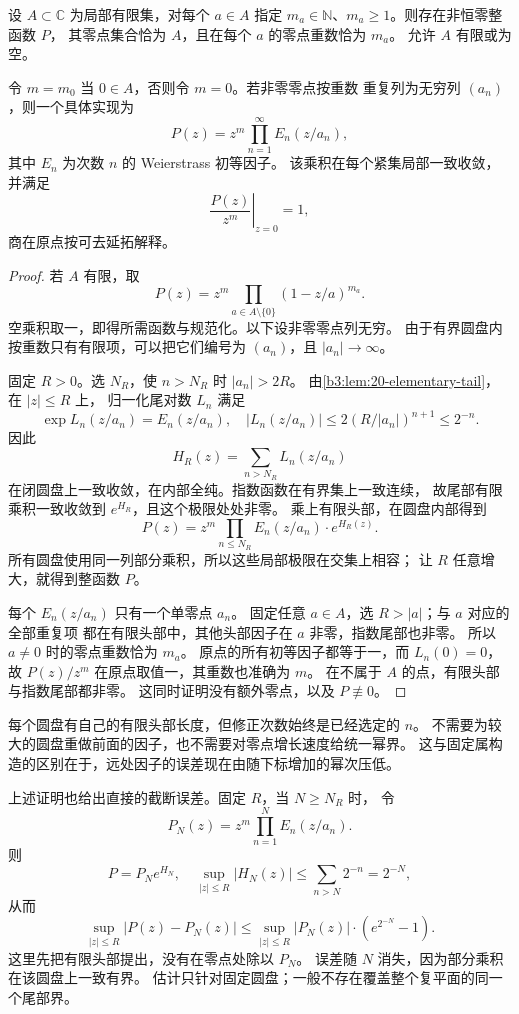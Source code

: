 \begin{theorem}\label{b3:thm:20-weierstrass}
设 \(A\subset\mathbb C\) 为局部有限集，对每个 \(a\in A\) 指定
\(m_a\in\mathbb N\)、\(m_a\ge1\)。则存在非恒零整函数 \(P\)，
其零点集合恰为 \(A\)，且在每个 \(a\) 的零点重数恰为 \(m_a\)。
允许 \(A\) 有限或为空。

\ProseParagraphBreak
令 \(m=m_0\) 当 \(0\in A\)，否则令 \(m=0\)。若非零零点按重数
重复列为无穷列 \((a_n)\)，则一个具体实现为
\begin{equation}\label{b3:eq:20-variable-genus-product}
 P(z)=z^m\prod_{n=1}^\infty E_n(z/a_n),
\end{equation}
其中 \(E_n\) 为次数 \(n\) 的 Weierstrass 初等因子。
该乘积在每个紧集局部一致收敛，并满足
\[
 \left.\frac{P(z)}{z^m}\right|_{z=0}=1,
\]
商在原点按可去延拓解释。
\end{theorem}
\begin{proof}
若 \(A\) 有限，取
\[
 P(z)=z^m\prod_{a\in A\setminus\{0\}}(1-z/a)^{m_a}.
\]
空乘积取一，即得所需函数与规范化。以下设非零零点列无穷。
由于有界圆盘内按重数只有有限项，可以把它们编号为
\((a_n)\)，且 \(|a_n|\to\infty\)。

固定 \(R>0\)。选 \(N_R\)，使 \(n>N_R\) 时 \(|a_n|>2R\)。
由\cref{b3:lem:20-elementary-tail}，在 \(|z|\le R\) 上，
归一化尾对数 \(L_n\) 满足
\[
 \exp L_n(z/a_n)=E_n(z/a_n),\quad
 |L_n(z/a_n)|\le2(R/|a_n|)^{n+1}\le2^{-n}.
\]
因此
\[
 H_R(z)=\sum_{n>N_R}L_n(z/a_n)
\]
在闭圆盘上一致收敛，在内部全纯。指数函数在有界集上一致连续，
故尾部有限乘积一致收敛到 \(e^{H_R}\)，且这个极限处处非零。
乘上有限头部，在圆盘内部得到
\[
 P(z)=z^m\prod_{n\le N_R}E_n(z/a_n)\cdot e^{H_R(z)}.
\]
所有圆盘使用同一列部分乘积，所以这些局部极限在交集上相容；
让 \(R\) 任意增大，就得到整函数 \(P\)。

每个 \(E_n(z/a_n)\) 只有一个单零点 \(a_n\)。
固定任意 \(a\in A\)，选 \(R>|a|\)；与 \(a\) 对应的全部重复项
都在有限头部中，其他头部因子在 \(a\) 非零，指数尾部也非零。
所以 \(a\ne0\) 时的零点重数恰为 \(m_a\)。
原点的所有初等因子都等于一，而 \(L_n(0)=0\)，
故 \(P(z)/z^m\) 在原点取值一，其重数也准确为 \(m\)。
在不属于 \(A\) 的点，有限头部与指数尾部都非零。
这同时证明没有额外零点，以及 \(P\not\equiv0\)。
\end{proof}

每个圆盘有自己的有限头部长度，但修正次数始终是已经选定的 \(n\)。
不需要为较大的圆盘重做前面的因子，也不需要对零点增长速度给统一幂界。
这与固定属构造的区别在于，远处因子的误差现在由随下标增加的幂次压低。

\ProseParagraphBreak
上述证明也给出直接的截断误差。固定 \(R\)，当 \(N\ge N_R\) 时，
令
\[
 P_N(z)=z^m\prod_{n=1}^N E_n(z/a_n).
\]
则
\[
 P=P_Ne^{H_N},\quad
 \sup_{|z|\le R}|H_N(z)|\le\sum_{n>N}2^{-n}=2^{-N},
\]
从而
\[
 \sup_{|z|\le R}|P(z)-P_N(z)|
 \le\sup_{|z|\le R}|P_N(z)|\cdot\left(e^{2^{-N}}-1\right).
\]
这里先把有限头部提出，没有在零点处除以 \(P_N\)。
误差随 \(N\) 消失，因为部分乘积在该圆盘上一致有界。
估计只针对固定圆盘；一般不存在覆盖整个复平面的同一个尾部界。

